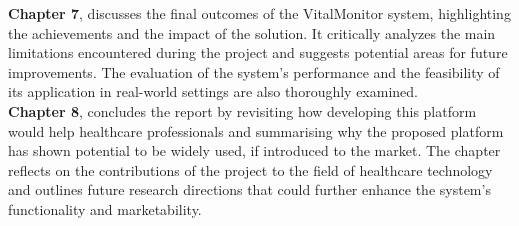 \noindent\textbf{Chapter 7}, discusses the final outcomes of the VitalMonitor system, highlighting the achievements and the impact of the solution. It critically analyzes the main limitations encountered during the project and suggests potential areas for future improvements. The evaluation of the system's performance and the feasibility of its application in real-world settings are also thoroughly examined.\\

\noindent\textbf{Chapter 8}, concludes the report by revisiting how developing this platform would help healthcare professionals and summarising why the proposed platform has shown potential to be widely used, if introduced to the market. The chapter reflects on the contributions of the project to the field of healthcare technology and outlines future research directions that could further enhance the system's functionality and marketability.
